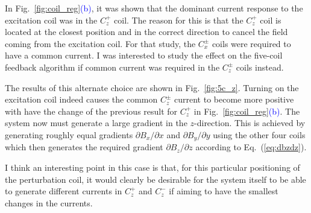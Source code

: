 
In Fig.~\ref{fig:coil_reg}\textcolor{blue}{(b)}, it was shown that the dominant current
response to the excitation coil was in the $C_z^+$ coil.  The reason
for this is that the $C_z^+$ coil is located at the closest position
and in the correct direction to cancel the field coming from the
excitation coil.  For that study, the $C_x^\pm$ coils were required to
have a common current.  I was interested to study the effect on the
five-coil feedback algorithm if common current was required in the
$C_z^\pm$ coils instead.

The results of this alternate choice are shown in Fig.~\ref{fig:5c_z}.
Turning on the excitation coil indeed causes the common $C_z^\pm$
current to become more positive with have the change of the previous
result for $C_z^+$ in Fig.~\ref{fig:coil_reg}\textcolor{blue}{(b)}.  The system now must
generate a large gradient in the $z$-direction.  This is achieved by
generating roughly equal gradients $\partial B_x/\partial x$ and
$\partial B_y/\partial y$ using the other four coils which then
generates the required gradient $\partial B_z/\partial z$ according to
Eq.~(\ref{eq:dbzdz}).

I think an interesting point in this case is that, for this particular
positioning of the perturbation coil, it would clearly be desirable
for the system itself to be able to generate different currents in
$C_z^+$ and $C_z^-$ if aiming to have the smallest changes in the
currents.



